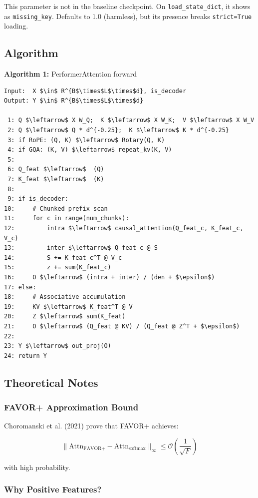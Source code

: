 This parameter is not in the baseline checkpoint. On \texttt{load\_state\_dict}, it 
shows as \texttt{missing\_key}. Defaults to 1.0 (harmless), but its presence breaks 
\texttt{strict=True} loading.

\subsection{Algorithm}

\textbf{Algorithm 1:} PerformerAttention forward
\begin{lstlisting}
Input:  X $\in$ R^{B$\times$L$\times$d}, is_decoder
Output: Y $\in$ R^{B$\times$L$\times$d}

 1: Q $\leftarrow$ X W_Q;  K $\leftarrow$ X W_K;  V $\leftarrow$ X W_V
 2: Q $\leftarrow$ Q * d^{-0.25};  K $\leftarrow$ K * d^{-0.25}
 3: if RoPE: (Q, K) $\leftarrow$ Rotary(Q, K)
 4: if GQA: (K, V) $\leftarrow$ repeat_kv(K, V)
 5:
 6: Q_feat $\leftarrow$  (Q)
 7: K_feat $\leftarrow$  (K)
 8:
 9: if is_decoder:
10:     # Chunked prefix scan
11:     for c in range(num_chunks):
12:         intra $\leftarrow$ causal_attention(Q_feat_c, K_feat_c, V_c)
13:         inter $\leftarrow$ Q_feat_c @ S
14:         S += K_feat_c^T @ V_c
15:         z += sum(K_feat_c)
16:     O $\leftarrow$ (intra + inter) / (den + $\epsilon$)
17: else:
18:     # Associative accumulation
19:     KV $\leftarrow$ K_feat^T @ V
20:     Z $\leftarrow$ sum(K_feat)
21:     O $\leftarrow$ (Q_feat @ KV) / (Q_feat @ Z^T + $\epsilon$)
22:
23: Y $\leftarrow$ out_proj(O)
24: return Y
\end{lstlisting}

\subsection{Theoretical Notes}

\subsubsection{FAVOR+ Approximation Bound}

Choromanski et al. (2021) prove that FAVOR+ achieves:

\[
\|\text{Attn}_{\text{FAVOR+}} - \text{Attn}_{\text{softmax}}\|_\infty \leq \mathcal{O}\!\left(\frac{1}{\sqrt{F}}\right)
\tag{4.7}
\]

with high probability.

\subsubsection{Why Positive Features?}


